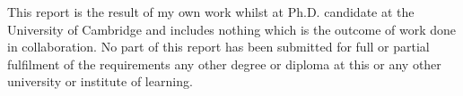 
\begin{declaration}

This report is the result of my own work whilst at Ph.D. candidate at the University of Cambridge and includes nothing which is the outcome of work done in collaboration. No part of this report has been submitted for full or partial fulfilment of the requirements any other degree or diploma at this or any other university or institute of learning.


\end{declaration}

